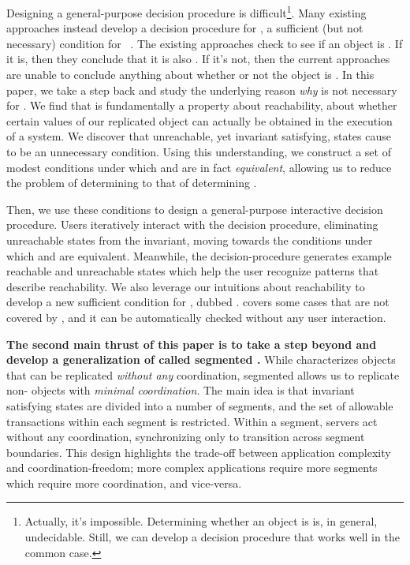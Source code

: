 Designing a general-purpose \invariantconfluence{} decision procedure is
difficult\footnote{Actually, it's impossible. Determining whether an object is
\invariantconfluent{} is, in general, undecidable. Still, we can develop a
decision procedure that works well in the common case.}. Many existing
approaches instead develop a decision procedure for \invariantclosure{}, a
sufficient (but not necessary) condition for
\invariantconfluence{}~\cite{li2012making, li2014automating}. The existing
approaches check to see if an object is \invariantclosed{}. If it is, then they
conclude that it is also \invariantconfluent{}. If it's not, then the current
approaches are unable to conclude anything about whether or not the object is
\invariantconfluent{}. In this paper, we take a step back and study the
underlying reason \emph{why} \invariantclosure{} is not necessary for
\invariantconfluence{}. We find that \invariantconfluence{} is fundamentally a
property about reachability, about whether certain values of our replicated
object can actually be obtained in the execution of a system. We discover that
unreachable, yet invariant satisfying, states cause \invariantclosure{} to be
an unnecessary condition. Using this understanding, we construct a set of
modest conditions under which \invariantclosure{} and \invariantconfluence{}
are in fact \emph{equivalent}, allowing us to reduce the problem of determining
\invariantconfluence{} to that of determining \invariantclosure{}.

Then, we use these conditions to design a general-purpose interactive
\invariantconfluence{} decision procedure. Users iteratively interact with the
decision procedure, eliminating unreachable states from the invariant, moving
towards the conditions under which \invariantclosure{} and
\invariantconfluence{} are equivalent. Meanwhile, the decision-procedure
generates example reachable and unreachable states which help the user
recognize patterns that describe reachability. We also leverage our intuitions
about reachability to develop a new sufficient condition for
\invariantconfluence{}, dubbed \mergereducibility. \Mergereducibility{} covers
some cases that are not covered by \invariantclosure{}, and it can be
automatically checked without any user interaction.

\textbf{The second main thrust of this paper is to take a step beyond
\invariantconfluence{} and develop a generalization of \invariantconfluence{}
called segmented \invariantconfluence{}.} While \invariantconfluence{}
characterizes objects that can be replicated \emph{without any} coordination,
segmented \invariantconfluence{} allows us to replicate
non-\invariantconfluent{} objects with \emph{minimal coordination}. The main
idea is that invariant satisfying states are divided into a number of segments,
and the set of allowable transactions within each segment is restricted.
Within a segment, servers act without any coordination, synchronizing only to
transition across segment boundaries. This design highlights the trade-off
between application complexity and coordination-freedom; more complex
applications require more segments which require more coordination, and
vice-versa.

